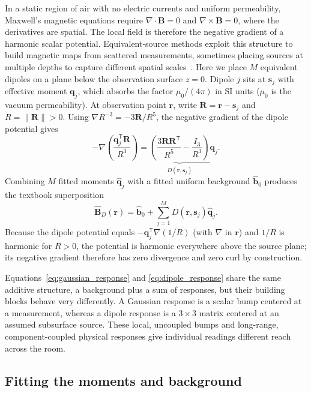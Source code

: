 \documentclass[11pt]{article}
\newcommand{\B}{\mathbf B}
\newcommand{\rr}{\mathbf r}
\newcommand{\bvec}{\mathbf b}
\begin{document}
In a static region of air with no electric currents and uniform permeability,
Maxwell's magnetic equations require \(\nabla\cdot\B=0\) and
\(\nabla\times\B=0\), where the derivatives are spatial. The local field is
therefore the negative gradient of a harmonic scalar potential.
Equivalent-source methods exploit this structure to build magnetic maps from
scattered measurements, sometimes placing sources at multiple depths to capture
different spatial scales~\cite{emilia,uppal}. Here we place \(M\) equivalent
dipoles on a plane below the observation surface \(z=0\). Dipole \(j\) sits at
\(\mathbf s_j\) with effective moment \(\mathbf q_j\), which absorbs the factor
\(\mu_0/(4\pi)\) in SI units (\(\mu_0\) is the vacuum permeability). At
observation point \(\rr\), write \(\mathbf R=\rr-\mathbf s_j\) and
\(R=\|\mathbf R\|>0\). Using \(\nabla R^{-3}=-3\mathbf R/R^5\), the negative
gradient of the dipole potential gives
\[
 -\nabla\!\left(\frac{\mathbf q_j^{\mathsf T}\mathbf R}{R^3}\right)
 =\underbrace{\left(\frac{3\mathbf R\mathbf R^{\mathsf T}}{R^5}
                     -\frac{I_3}{R^3}\right)}_{D(\rr,\mathbf s_j)}\mathbf q_j.
\]
Combining \(M\) fitted moments \(\widehat{\mathbf q}_j\) with a fitted uniform
background \(\widehat{\bvec}_0\) produces the textbook superposition
\begin{equation}
 \widehat{\B}_D(\rr)=\widehat{\bvec}_0+
 \sum_{j=1}^{M} D(\rr,\mathbf s_j)\widehat{\mathbf q}_j .
 \label{eq:dipole_response}
\end{equation}
Because the dipole potential equals \(-\mathbf q_j^{\mathsf T}\nabla(1/R)\)
(with \(\nabla\) in \(\rr\)) and \(1/R\) is harmonic for \(R>0\), the potential
is harmonic everywhere above the source plane; its negative gradient therefore
has zero divergence and zero curl by construction.

Equations~\eqref{eq:gaussian_response} and \eqref{eq:dipole_response} share the
same additive structure, a background plus a sum of responses, but their
building blocks behave very differently. A Gaussian response is a scalar bump
centered at a measurement, whereas a dipole response is a \(3\times3\) matrix
centered at an assumed subsurface source. These local, uncoupled bumps and
long-range, component-coupled physical responses give individual readings
different reach across the room.

\subsection{Fitting the moments and background}
\end{document}
